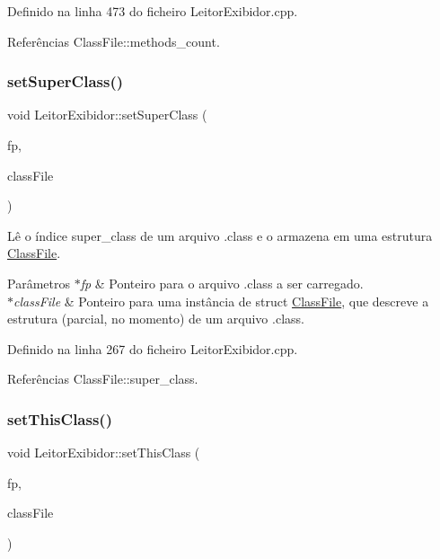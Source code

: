 Definido na linha 473 do ficheiro Leitor\+Exibidor.\+cpp.



Referências Class\+File\+::methods\+\_\+count.

\mbox{\label{classLeitorExibidor_af726ef535e88d9d86938a2d6aad6658c}} 
\subsubsection{\texorpdfstring{set\+Super\+Class()}{setSuperClass()}}
{\footnotesize\ttfamily void Leitor\+Exibidor\+::set\+Super\+Class (\begin{DoxyParamCaption}\item[{F\+I\+LE $\ast$}]{fp,  }\item[{\hyperlink{classClassFile}{Class\+File} $\ast$}]{class\+File }\end{DoxyParamCaption})\hspace{0.3cm}{\ttfamily [private]}}

Lê o índice super\+\_\+class de um arquivo .class e o armazena em uma estrutura \hyperlink{classClassFile}{Class\+File}. 
\begin{DoxyParams}{Parâmetros}
{\em $\ast$fp} & Ponteiro para o arquivo .class a ser carregado. \\
\hline
{\em $\ast$class\+File} & Ponteiro para uma instância de struct \hyperlink{classClassFile}{Class\+File}, que descreve a estrutura (parcial, no momento) de um arquivo .class. \\
\hline
\end{DoxyParams}


Definido na linha 267 do ficheiro Leitor\+Exibidor.\+cpp.



Referências Class\+File\+::super\+\_\+class.

\mbox{\label{classLeitorExibidor_af0f402911ed326bd9e495eef93a43c24}} 
\subsubsection{\texorpdfstring{set\+This\+Class()}{setThisClass()}}
{\footnotesize\ttfamily void Leitor\+Exibidor\+::set\+This\+Class (\begin{DoxyParamCaption}\item[{F\+I\+LE $\ast$}]{fp,  }\item[{\hyperlink{classClassFile}{Class\+File} $\ast$}]{class\+File }\end{DoxyParamCaption})\hspace{0.3cm}{\ttfamily [private]}}

